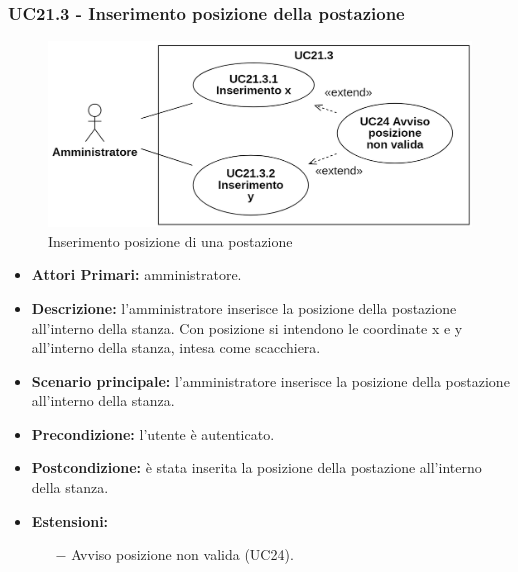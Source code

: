 \subsubsection{UC21.3 - Inserimento posizione della postazione}
\begin{figure}[H]
	\centering
	\includegraphics[width=12cm]{res/images/UC21.3.png}
	\caption{Inserimento posizione di una postazione}
\end{figure}
\begin{itemize}
	\item\textbf{Attori Primari:}
	amministratore.
	\item\textbf{Descrizione:}
	l'amministratore inserisce la posizione della postazione all'interno della stanza. Con posizione si intendono le coordinate x e y all'interno della stanza, intesa come scacchiera.
	\item\textbf{Scenario principale:} 
	l'amministratore inserisce la posizione della postazione all'interno della stanza.
	\item\textbf{Precondizione:} 
	l'utente è autenticato.
	\item\textbf{Postcondizione:}
	è stata inserita la posizione della postazione all'interno della stanza.
	\item\textbf{Estensioni:}
	\begin{itemize}
		\item[$-$] Avviso posizione non valida (UC24).
	\end{itemize}
\end{itemize}

